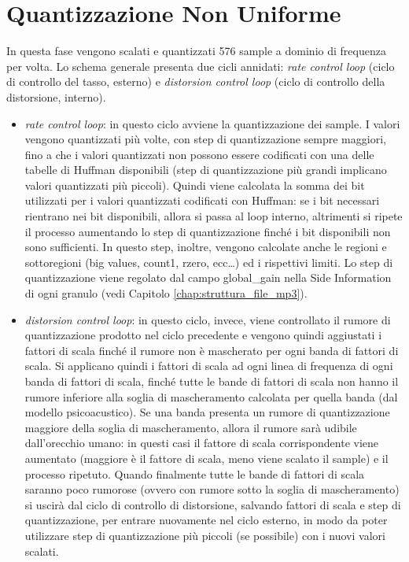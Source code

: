 	\section{Quantizzazione Non Uniforme} \label{sec:quantizzazione_non_uniforme}
		
		In questa fase vengono scalati e quantizzati 576 sample a dominio di frequenza per volta. Lo schema generale presenta due cicli annidati: \textit{rate control loop} (ciclo di controllo del tasso, esterno) e \textit{distorsion control loop} (ciclo di controllo della distorsione, interno).
		
		\begin{itemize}
			\item \textit{rate control loop}: in questo ciclo avviene la quantizzazione dei sample. I valori vengono quantizzati più volte, con step di quantizzazione sempre maggiori, fino a che i valori quantizzati non possono essere codificati con una delle tabelle di Huffman disponibili (step di quantizzazione più grandi implicano valori quantizzati più piccoli). Quindi viene calcolata la somma dei bit utilizzati per i valori quantizzati codificati con Huffman: se i bit necessari rientrano nei bit disponibili, allora si passa al loop interno, altrimenti si ripete il processo aumentando lo step di quantizzazione finché i bit disponibili non sono sufficienti. In questo step, inoltre, vengono calcolate anche le regioni e sottoregioni (big values, count1, rzero, ecc\dots) ed i rispettivi limiti. Lo step di quantizzazione viene regolato dal campo global\_gain nella Side Information di ogni granulo (vedi Capitolo \ref{chap:struttura_file_mp3}).
			
			\item \textit{distorsion control loop}: in questo ciclo, invece, viene controllato il rumore di quantizzazione prodotto nel ciclo precedente e vengono quindi aggiustati i fattori di scala finché il rumore non è mascherato per ogni banda di fattori di scala. Si applicano quindi i fattori di scala ad ogni linea di frequenza di ogni banda di fattori di scala, finché tutte le bande di fattori di scala non hanno il rumore inferiore alla soglia di mascheramento calcolata per quella banda (dal modello psicoacustico). Se una banda presenta un rumore di quantizzazione maggiore della soglia di mascheramento, allora il rumore sarà udibile dall'orecchio umano: in questi casi il fattore di scala corrispondente viene aumentato (maggiore è il fattore di scala, meno viene scalato il sample) e il processo ripetuto. Quando finalmente tutte le bande di fattori di scala saranno poco rumorose (ovvero con rumore sotto la soglia di mascheramento) si uscirà dal ciclo di controllo di distorsione, salvando fattori di scala e step di quantizzazione, per entrare nuovamente nel ciclo esterno, in modo da poter utilizzare step di quantizzazione più piccoli (se possibile) con i nuovi valori scalati.
			
		\end{itemize}
		
